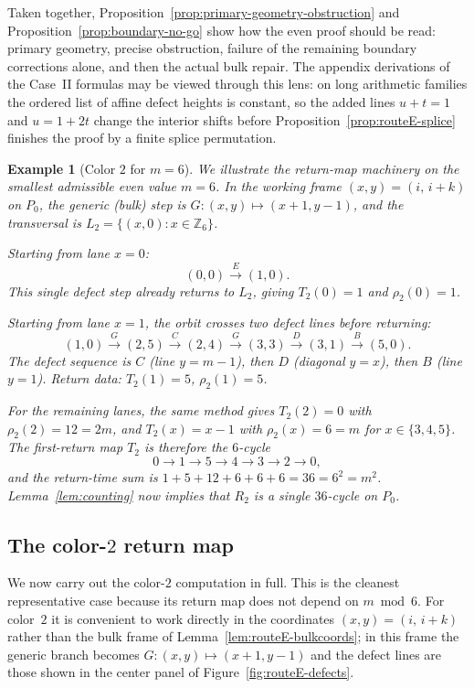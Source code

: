 \documentclass[11pt]{article}
\newtheorem{example}{Example}
\begin{document}
Taken together, Proposition~\ref{prop:primary-geometry-obstruction} and Proposition~\ref{prop:boundary-no-go} show how the even proof should be read: primary geometry, precise obstruction, failure of the remaining boundary corrections alone, and then the actual bulk repair.
The appendix derivations of the Case~II formulas may be viewed through this lens: on long arithmetic families the ordered list of affine defect heights is constant, so the added lines $u+t=1$ and $u=1+2t$ change the interior shifts before Proposition~\ref{prop:routeE-splice} finishes the proof by a finite splice permutation.

\begin{example}[Color $2$ for $m=6$]\label{ex:m6-color2}
We illustrate the return-map machinery on the smallest admissible even value $m=6$.
In the working frame $(x,y)=(i,\,i+k)$ on $P_0$, the generic (bulk) step is $G\colon(x,y)\mapsto(x+1,y-1)$, and the transversal is $L_2=\{(x,0):x\in\mathbb Z_6\}$.

Starting from lane $x=0$:
\[
(0,0)\xrightarrow{E}(1,0).
\]
This single defect step already returns to $L_2$, giving $T_2(0)=1$ and $\rho_2(0)=1$.

Starting from lane $x=1$, the orbit crosses two defect lines before returning:
\[
(1,0)\xrightarrow{G}(2,5)\xrightarrow{C}(2,4)\xrightarrow{G}(3,3)
\xrightarrow{D}(3,1)\xrightarrow{B}(5,0).
\]
The defect sequence is $C$ (line $y=m{-}1$), then $D$ (diagonal $y=x$), then $B$ (line $y=1$).
Return data: $T_2(1)=5$, $\rho_2(1)=5$.

For the remaining lanes, the same method gives $T_2(2)=0$ with $\rho_2(2)=12=2m$, and $T_2(x)=x-1$ with $\rho_2(x)=6=m$ for $x\in\{3,4,5\}$.
The first-return map $T_2$ is therefore the $6$-cycle
\[
0\to 1\to 5\to 4\to 3\to 2\to 0,
\]
and the return-time sum is $1+5+12+6+6+6=36=6^2=m^2$.
Lemma~\ref{lem:counting} now implies that $R_2$ is a single $36$-cycle on $P_0$.
\end{example}

\subsection{The color-$2$ return map}\label{sec:even-r2}
We now carry out the color-$2$ computation in full.
This is the cleanest representative case because its return map does not depend on $m\bmod 6$.
For color~$2$ it is convenient to work directly in the coordinates $(x,y)=(i,\,i+k)$ rather than the bulk frame of Lemma~\ref{lem:routeE-bulkcoords}; in this frame the generic branch becomes $G\colon(x,y)\mapsto(x+1,y-1)$ and the defect lines are those shown in the center panel of Figure~\ref{fig:routeE-defects}.
\end{document}
